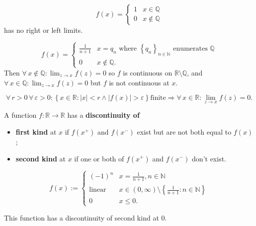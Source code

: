 \documentclass{notes}
\begin{document}
  \begin{eg}
    \begin{equation}
      f(x) = \begin{cases}
        1 & x \in \mathbb Q \\ 
        0 & x \not \in \mathbb Q
      \end{cases}
    \end{equation}
    has no right or left limits.
  \end{eg}
  
  \begin{eg}
    \begin{equation}
      f(x) = \begin{cases}
        \frac{1}{n + 1} & x = q_n \text{ where $\left \{ q_n \right \}_{n \in \mathbb N}$ enumerates $\mathbb Q$} \\ 
        0 & x \not \in \mathbb Q.
      \end{cases}
    \end{equation}
    Then $\forall \, x \not \in \mathbb Q: \lim_{z \to x} f(z) = 0$ so $f$ is continuous on $\mathbb R \setminus \mathbb Q$, and $\forall \, x \in \mathbb Q: \lim_{z \to x} f(z) = 0$ but $f$ is not continuous at $x$.
  \end{eg}
  
  \begin{lem}
    \[
      \forall \, r > 0 \, \forall \, \varepsilon > 0: \left \{ x \in \mathbb R : \left | x \right | < r \land \left | f(x) \right | > \varepsilon \right \} \text{finite} \Rightarrow \forall \, x \in \mathbb R: \lim_{z \to x} f(z) = 0.
    \]
  \end{lem}
  
  \begin{defn}
    A function $f \colon \mathbb R \to \mathbb R$ has a {\boldmath \bfseries discontinuity of }
    \begin{itemize}
      \item {\boldmath \bfseries first kind} at $x$ if $f(x^+)$ and $f(x^-)$ exist but are not both equal to $f(x)$;

      \item {\boldmath \bfseries second kind} at $x$ if one or both of $f(x^+)$ and $f(x^-)$ don't exist.
    \end{itemize}
  \end{defn}
  
  \newpage
  
  \begin{eg}
    \begin{equation}
      f(x) := \begin{cases}
        (-1)^n & x = \frac{1}{n + 1}, n \in \mathbb N \\ 
        \text{linear} & x \in (0, \infty) \setminus \left \{ \frac{1}{n + 1} : n \in \mathbb N \right \} \\ 
        0 & x \leq 0.
      \end{cases}
    \end{equation}
    
    
    This function has a discontinuity of second kind at 0.
  \end{eg}
\end{document}
